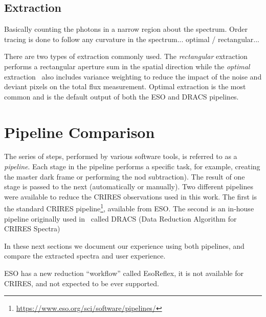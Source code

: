 
\subsection{Extraction}
Basically counting the photons in a narrow region about the spectrum. Order tracing is done to follow any curvature in the spectrum...
optimal / rectangular...

There are two types of extraction commonly used. The \emph{rectangular} extraction performs a rectangular aperture sum in the spatial direction while the \emph{optimal} extraction~\citep{horne_optimal_1986} also includes variance weighting to reduce the impact of the noise and deviant pixels on the total flux measurement. Optimal extraction is the most common and is the default output of both the ESO and DRACS pipelines.

\section{Pipeline Comparison}
The series of steps, performed by various software tools, is referred to as a \emph{pipeline}. Each stage in the pipeline performs a specific task, for example, creating the master dark frame or performing the nod subtraction). The result of one stage is passed to the next (automatically or manually). Two different pipelines were available to reduce the CRIRES observations used in this work. The first is the standard CRIRES pipeline\footnote{\href{https://www.eso.org/sci/software/pipelines/}{https://www.eso.org/sci/software/pipelines/}}, available from ESO.
The second is an in-house pipeline originally  used in~\citet{figueira_radial_2010} called DRACS (Data Reduction Algorithm for CRIRES Spectra) 

In these next sections we document our experience using both pipelines, and compare the extracted spectra and user experience.

ESO has a new reduction ``workflow'' called EsoReflex, it is not available for CRIRES, and not expected to be ever supported.

